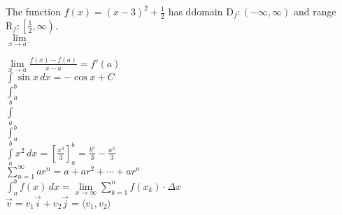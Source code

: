 \documentclass[11pt]{article}
\begin{document}
	The function $f(x)=(x-3)^2+\frac{1}{2}$ has ddomain $\mathrm{D}_f:(-\infty,\infty)$ and range $\mathrm{R}_f:\left[\frac{1}{2},\infty \right)$.\\
	
	$\lim\limits_{x \to a^-}$
	
	$\displaystyle{\lim\limits_{x \to a}\frac{f(x)-f(a)}{x-a} = f'(a)}$ \\
	
	$\displaystyle{\int \sin x\,dx = -\cos x + C}$ \\
	
	$\int_a^b$ \\
	
	$\int \limits_a^b$ \\
	
	
	$\displaystyle{\int_a^b}$ \\
	
	$\displaystyle{\int \limits_a^bx^2 \, dx=\left[\frac{x^3}{3}\right]_a^b} = \frac{b^3}{3} - \frac{a^3}{3}$ \\

	$\displaystyle{\sum \limits_{n=1}^{\infty}ar^n=a+ar^2+\cdots+ar^n}$	\\
	
	$\displaystyle{\int_a^b f(x) \, dx=\lim \limits_{x \to \infty} \sum \limits_{k=1}^{n}f(x_k) \cdot \Delta x}$ \\
	
	$\vec{v}=v_1 \vec{i}+v_2 \vec{j}=\langle v_1,v_2 \rangle$
	
	
\end{document}
